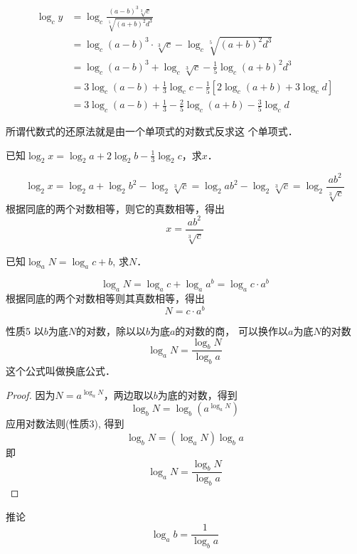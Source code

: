 \begin{solution}
\[\begin{split}
    \log_c y&=\log_c \frac{(a-b)^3\sqrt[3]{c}}{\sqrt[5]{(a+b)^2d^3}}\\ 
&=\log_c (a-b)^3\cdot \sqrt[3]{c}  -\log_c \sqrt[5]{(a+b)^2d^3}\\
&=\log_c (a-b)^3+ \log_c \sqrt[3]{c}  -\frac{1}{5}\log_c {(a+b)^2d^3}\\
&=3\log_c (a-b)+\frac{1}{3}\log_c  c-\frac{1}{5}[2\log_c (a+b)+3\log_c d]\\
&=3\log_c (a-b)+\frac{1}{3}-\frac{2}{5}\log_c (a+b)-\frac{3}{5}\log_c d
\end{split}\]
\end{solution}

所谓代数式的还原法就是由一个单项式的对数式反求这
个单项式．

\begin{example}
已知$\log_2 x=\log_2 a+2\log_2 b-\frac{1}{3}\log_2 c$，求$x$．
\end{example}

\begin{solution}
    \[\log_2 x=\log_2 a+\log_2 b^2-\log_2 \sqrt[3]{c}=\log_2 ab^2-\log_2 \sqrt[3]{c}
=\log_2 \frac{ab^2}{\sqrt[3]{c}}\]
根据同底的两个对数相等，则它的真数相等，得出
\[x=\frac{ab^2}{\sqrt[3]{c}}\]
\end{solution}    


\begin{example}
    已知$\log_a N=\log_ac+b$, 求$N$．
\end{example}


\begin{solution}
\[\log_a N=\log_a c+\log_a a^b=\log_a c\cdot a^b\]
根据同底的两个对数相等则其真数相等，得出
\[N=c\cdot a^b\] 
\end{solution}

\begin{blk}{性质5}
    以$b$为底$N$的对数，除以以$b$为底$a$的对数的商，
可以换作以$a$为底$N$的对数
\[\log_a N=\frac{\log_b N}{\log_b a}\]
这个公式叫做换底公式．
\end{blk}


\begin{proof}
    因为$N=a^{\log_a N}$，两边取以$b$为底的对数，得到
    \[\log_b N = \log_b \left(a^{\log_a N}\right)\]
    应用对数法则(性质3), 得到
\[\log_b N=(\log_a N)\log_ba\]
即
\[\log_a N=\frac{\log_b N}{\log_b a}\]

\end{proof}


\begin{blk}{推论}
    $$\log_ab=\frac{1}{\log_ba}$$
\end{blk}


